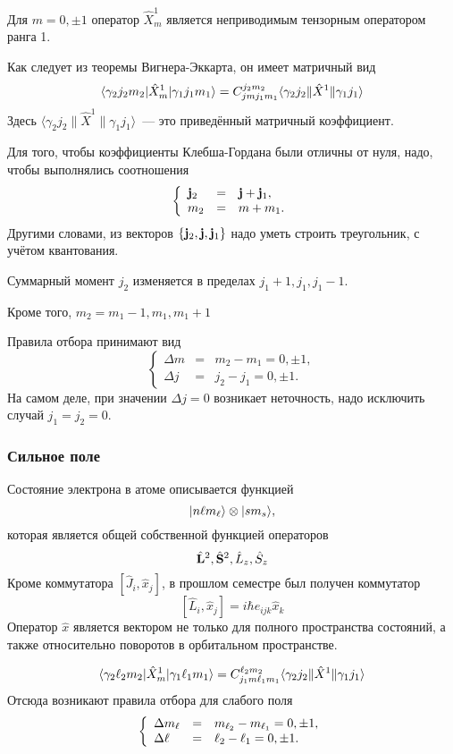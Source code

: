 Для $m = 0, \pm 1$ оператор $\hat X_m^1$ является неприводимым тензорным оператором ранга 1.

Как следует из теоремы Вигнера-Эккарта, он имеет матричный вид
$$
    \qtri{\gamma_2 j_2 m_2}{\hat X_m^1}{\gamma_1 j_1 m_1} = C_{jm j_1 m_1}^{j_2 m_2} \langle \gamma_2 j_2 \| \hat X^1 \| \gamma_1 j_1 \rangle
$$
Здесь $\langle \gamma_2 j_2 \| \hat X^1 \| \gamma_1 j_1 \rangle$~--- это приведённый матричный коэффициент.

Для того, чтобы коэффициенты Клебша-Гордана были отличны от нуля, надо, чтобы выполнялись соотношения
$$
    \left\{
      \begin{array}{lcl}
        \bf j_2 & = & \bf j + \bf j_1 ,\\
        m_2 & = & m + m_1.
      \end{array}
    \right.
$$
Другими словами, из векторов $\{\bf j_2, \bf j, \bf j_1\}$ надо уметь строить треугольник, с учётом квантования.

Суммарный момент $j_2$ изменяется в пределах $j_1+1, j_1, j_1 - 1$.

Кроме того, $m_2 = m_1 - 1, m_1, m_1 + 1$

Правила отбора принимают вид
$$
    \left\{
      \begin{array}{lcl}
        \Delta m & = & m_2 - m_1 = 0, \pm 1 ,\\
        \Delta j & = & j_2 - j_1 = 0, \pm 1.
      \end{array}
    \right.
$$
На самом деле, при значении $\Delta j = 0$ возникает неточность, надо исключить случай $j_1 = j_2 = 0$.

\subsubsection{Сильное поле}

Состояние электрона в атоме описывается функцией
$$
    \qu{n \l m_\l} \otimes \qu{s m_s},
$$
которая является общей собственной функцией операторов
$$
    \hat{\bf L}^2, \hat{\bf S}^2, \hat L_z, \hat S_z
$$
Кроме коммутатора $[\hat J_i, \hat x_j]$, в прошлом семестре был получен коммутатор
$$
    [\hat L_i, \hat x_j] = i \hbar e_{ijk} \hat x_k
$$
Оператор $\hat x$ является вектором не только для полного пространства состояний, а также относительно поворотов в орбитальном пространстве.

$$
    \qtri{\gamma_2 \l_2 m_2}{\hat X_m^1}{\gamma_1 \l_1 m_1} = C_{j_1 m \l_1 m_1}^{\l_2 m_2} \langle \gamma_2 j_2 \| \hat X^1 \| \gamma_1 j_1 \rangle
$$ 
Отсюда возникают правила отбора для слабого поля
$$
    \left\{
      \begin{array}{lcl}
        \Delta m_\l & = & m_{\l_2} - m_{\l_1} = 0, \pm 1 ,\\
        \Delta \l & = & \l_2 - \l_1 = 0, \pm 1.
      \end{array}
    \right.
$$

